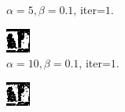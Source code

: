\documentclass{article}
\begin{document}
\begin{figure}[t]
\begin{subfigure}[t]{0.27\textwidth}
  \vspace{-0.6cm}
  \caption{$\alpha=5, \beta=0.1$, iter=$1$.}
\end{subfigure}
\begin{subfigure}[t]{0.27\textwidth}
  \centering
  \includegraphics[width=\textwidth]{ii_alpha_10_beta_0.1_iterations_2.bmp}
  \vspace{-0.6cm}
  \caption{$\alpha=10, \beta=0.1$, iter=$1$.}
\end{subfigure}
\begin{subfigure}[t]{0.27\textwidth}
  \centering
  \includegraphics[width=\textwidth]{ii_alpha_2_beta_0.1_iterations_3.bmp}

\end{subfigure}
\end{figure}
\end{document}
